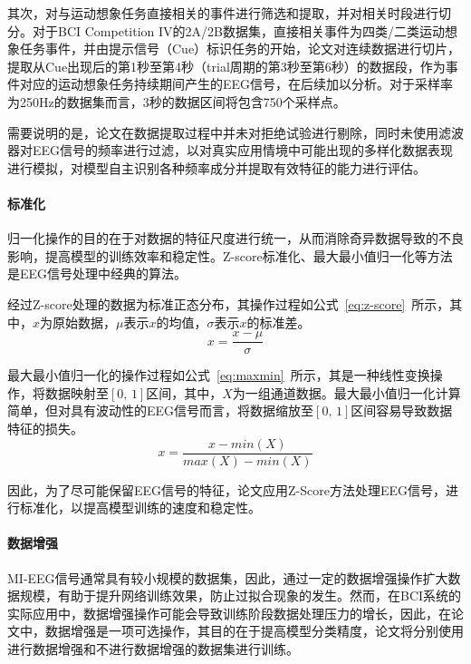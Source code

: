其次，对与运动想象任务直接相关的事件进行筛选和提取，并对相关时段进行切分。对于BCI Competition IV的2A/2B数据集，直接相关事件为四类/二类运动想象任务事件，并由提示信号（Cue）标识任务的开始，论文对连续数据进行切片，提取从Cue出现后的第1秒至第4秒（trial周期的第3秒至第6秒）的数据段，作为事件对应的运动想象任务持续期间产生的EEG信号，在后续加以分析。对于采样率为250Hz的数据集而言，3秒的数据区间将包含750个采样点。

需要说明的是，论文在数据提取过程中并未对拒绝试验进行剔除，同时未使用滤波器对EEG信号的频率进行过滤，以对真实应用情境中可能出现的多样化数据表现进行模拟，对模型自主识别各种频率成分并提取有效特征的能力进行评估。

\paragraph{标准化}

归一化操作的目的在于对数据的特征尺度进行统一，从而消除奇异数据导致的不良影响，提高模型的训练效率和稳定性。Z-score标准化、最大最小值归一化等方法是EEG信号处理中经典的算法。

经过Z-score处理的数据为标准正态分布，其操作过程如公式~\ref{eq:z-score}~所示，其中，\(x\)为原始数据，\(\mu\)表示\(x\)的均值，\(\sigma\)表示\(x\)的标准差。
\begin{equation}
    x=\frac{x-\mu}{\sigma}
    \label{eq:z-score}
\end{equation}

最大最小值归一化的操作过程如公式~\ref{eq:maxmin}~所示，其是一种线性变换操作，将数据映射至\([0,\,1]\)区间，其中，\(X\)为一组通道数据。最大最小值归一化计算简单，但对具有波动性的EEG信号而言，将数据缩放至\([0,\,1]\)区间容易导致数据特征的损失。
\begin{equation}
    x=\frac{x-min(X)}{max(X)-min(X)}
    \label{eq:maxmin}
\end{equation}

因此，为了尽可能保留EEG信号的特征，论文应用Z-Score方法处理EEG信号，进行标准化，以提高模型训练的速度和稳定性。

\paragraph{数据增强}

MI-EEG信号通常具有较小规模的数据集，因此，通过一定的数据增强操作扩大数据规模，有助于提升网络训练效果，防止过拟合现象的发生。然而，在BCI系统的实际应用中，数据增强操作可能会导致训练阶段数据处理压力的增长，因此，在论文中，数据增强是一项可选操作，其目的在于提高模型分类精度，论文将分别使用进行数据增强和不进行数据增强的数据集进行训练。

